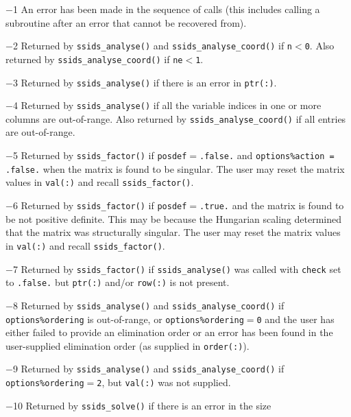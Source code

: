 \begin{description}
\item{$-$1} An error has been made in the sequence of calls (this includes
            calling a subroutine after an error that cannot be recovered from).
\item{$-$2} Returned by {\tt ssids\_analyse()} and {\tt ssids\_analyse\_coord()}
            if {\tt n$<$0}. Also returned by {\tt ssids\_analyse\_coord()} if
            {\tt ne$<$1}.
\item{$-$3} Returned by {\tt ssids\_analyse()} if there is an error in
            {\tt ptr(:)}.
\item{$-$4} Returned by {\tt ssids\_analyse()} if all the variable indices in
            one or more columns  are out-of-range. Also returned by
            {\tt ssids\_analyse\_coord()} if all entries are out-of-range.
\item{$-$5} Returned by {\tt ssids\_factor()} if
            {\tt posdef}$=${\tt .false.} and
            {\tt options\%action = .false.} when the matrix is found to be
            singular. The user may reset the matrix values in {\tt val(:)}
            and recall {\tt ssids\_factor()}.
\item{$-$6} Returned by {\tt ssids\_factor()} if
            {\tt posdef}$=${\tt .true.} and the matrix is found to
            be not positive definite. This may be because the Hungarian scaling
            determined that the matrix was structurally singular. The user may
            reset the matrix values in {\tt val(:)} and recall
            {\tt ssids\_factor()}.
\item{$-$7} Returned by {\tt ssids\_factor()} if {\tt ssids\_analyse()} was
            called with {\tt check} set to {\tt .false.} but {\tt ptr(:)}
            and/or {\tt row(:)} is not present.
\item{$-$8} Returned by {\tt ssids\_analyse()}  and
            {\tt ssids\_analyse\_coord()} if {\tt options\%ordering} is
            out-of-range, or {\tt options\%ordering}$=${\tt 0} and the user
            has either failed to provide an elimination order or an error has
            been found in the user-supplied elimination order (as supplied in
            {\tt order(:)}).
\item{$-$9} Returned by {\tt ssids\_analyse()} and
            {\tt ssids\_analyse\_coord()} if {\tt options\%ordering}$=${\tt 2},
            but {\tt val(:)} was not supplied.
\item{$-$10} Returned by {\tt ssids\_solve()} if there is an error in the size

\end{description}

